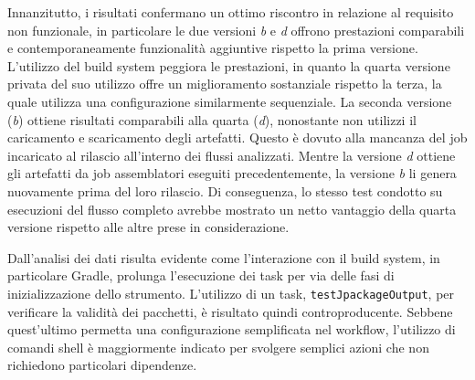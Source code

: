 Innanzitutto, i risultati confermano un ottimo riscontro in relazione al requisito non funzionale, in particolare le due versioni \textit{b} e \textit{d} offrono prestazioni comparabili e contemporaneamente funzionalità aggiuntive rispetto la prima versione. L'utilizzo del build system peggiora le prestazioni, in quanto la quarta versione privata del suo utilizzo offre un miglioramento sostanziale rispetto la terza, la quale utilizza una configurazione similarmente sequenziale. La seconda versione (\textit{b}) ottiene risultati comparabili alla quarta (\textit{d}), nonostante non utilizzi il caricamento e scaricamento degli artefatti. Questo è dovuto alla mancanza del job incaricato al rilascio all'interno dei flussi analizzati. Mentre la versione \textit{d} ottiene gli artefatti da job assemblatori eseguiti precedentemente, la versione \textit{b} li genera nuovamente prima del loro rilascio. Di conseguenza, lo stesso test condotto su esecuzioni del flusso completo avrebbe mostrato un netto vantaggio della quarta versione rispetto alle altre prese in considerazione.

Dall'analisi dei dati risulta evidente come l'interazione con il build system, in particolare Gradle, prolunga l'esecuzione dei task per via delle fasi di inizializzazione dello strumento. L'utilizzo di un task, \texttt{testJpackageOutput}, per verificare la validità dei pacchetti, è risultato quindi controproducente. Sebbene quest'ultimo permetta una configurazione semplificata nel workflow, l'utilizzo di comandi shell è maggiormente indicato per svolgere semplici azioni che non richiedono particolari dipendenze.